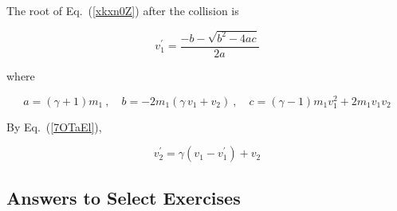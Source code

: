 \documentclass{article}
\numberwithin{equation}{section}
\numberwithin{figure}{section}
\begin{document}
The root of Eq.~(\ref{xkxn0Z}) after the collision is

\begin{equation*}
    v_1^{\prime} = \frac{-b - \sqrt{b^2 - 4ac}}{2a}
\end{equation*}

where

\begin{equation*}
    a = (\gamma + 1) m_1\ , \quad
    b = - 2 m_1 \left(\gamma\, v_1 + v_2\right)\ , \quad
    c = \left(\gamma - 1\right) m_1 v_1^2 + 2 m_1 v_1 v_2
\end{equation*}

By Eq.~(\ref{7OTaEl}), 

\begin{equation*}
    v_2^{\prime} = \gamma \left(v_1 - v_1^{\prime}\right) + v_2
\end{equation*}


\clearpage
\printnoidxglossaries

\clearpage

\subsection{Answers to Select Exercises}
\end{document}
